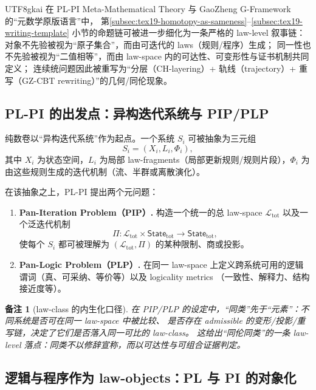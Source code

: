 \documentclass[12pt]{article}
\newtheorem{remark}{备注}[section]
\begin{document}
\begin{CJK*}{UTF8}{gkai}
在 PL-PI Meta-Mathematical Theory 与 GaoZheng G-Framework 的“元数学原版语言”中，
第\ref{subsec:tex19-homotopy-as-sameness}--\ref{subsec:tex19-writing-template} 小节的命题链可被进一步细化为一条严格的 law-level 叙事链：
对象不先验被视为“原子集合”，而由可迭代的 laws（规则/程序）生成；
同一性也不先验被视为“二值相等”，而由 law-space 内的可达性、可变形性与证书机制共同定义；
连续统问题因此被重写为“分层（CH-layering）+ 轨线（trajectory）+ 重写（GZ-CBT rewriting）”的几何/同伦现象。
\cite{GaoZheng2025GFramework,AxiomSemanticsWorkflowTex18}

\subsection{PL-PI 的出发点：异构迭代系统与 PIP/PLP}
\label{subsec:tex19-ch2-pip-plp}

纯数卷以“异构迭代系统”作为起点。一个系统 $S_i$ 可被抽象为三元组
\[
S_i=(X_i,L_i,\Phi_i),
\]
其中 $X_i$ 为状态空间，$L_i$ 为局部 law-fragments（局部更新规则/规则片段），$\Phi_i$ 为由这些规则生成的迭代机制（流、半群或离散演化）。

在该抽象之上，PL-PI 提出两个元问题：
\begin{enumerate}
  \item \textbf{Pan-Iteration Problem（PIP）.}
  构造一个统一的总 law-space $\mathcal{L}_{\mathrm{tot}}$ 以及一个泛迭代机制
  \[
    \Pi:\mathcal{L}_{\mathrm{tot}}\times \mathsf{State}_{\mathrm{tot}}\to \mathsf{State}_{\mathrm{tot}},
  \]
  使每个 $S_i$ 都可被理解为 $(\mathcal{L}_{\mathrm{tot}},\Pi)$ 的某种限制、商或投影。
  \item \textbf{Pan-Logic Problem（PLP）.}
  在同一 law-space 上定义跨系统可用的逻辑谓词（真、可采纳、等价等）以及 logicality metrics
  （一致性、解释力、结构接近度等）。
\end{enumerate}

\begin{remark}[law-class 的内生化口径]
在 PIP/PLP 的设定中，“同类”先于“元素”：不同系统是否可在同一 law-space 中被比较、
是否存在 admissible 的变形/投影/重写链，决定了它们是否落入同一可比的 law-class。
这给出“同伦同类”的一条 law-level 落点：同类不以修辞宣称，而以可达性与可组合证据判定。
\end{remark}

\subsection{逻辑与程序作为 law-objects：PL 与 PI 的对象化}
\label{subsec:tex19-ch2-pl-pi-as-law-objects}


\end{CJK*}
\end{document}
